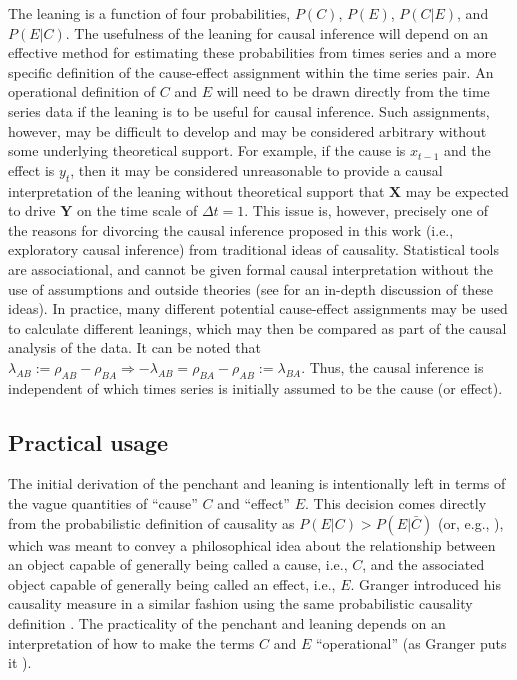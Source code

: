 The leaning is a function of four probabilities, $P(C)$, $P(E)$, $P(C|E)$, and $P(E|C)$.  The usefulness of the leaning for causal inference will depend on an effective method for estimating these probabilities from times series and a more specific definition of the cause-effect assignment within the time series pair.  An operational definition of $C$ and $E$ will need to be drawn directly from the time series data if the leaning is to be useful for causal inference.  Such assignments, however, may be difficult to develop and may be considered arbitrary without some underlying theoretical support.  For example, if the cause is $x_{t-1}$ and the effect is $y_{t}$, then it may be considered unreasonable to provide a causal interpretation of the leaning without theoretical support that $\mathbf{X}$ may be expected to drive $\mathbf{Y}$ on the time scale of $\Delta t=1$.  This issue is, however, precisely one of the reasons for divorcing the causal inference proposed in this work (i.e., exploratory causal inference) from traditional ideas of causality.  Statistical tools are associational, and cannot be given formal causal interpretation without the use of assumptions and outside theories (see \cite{Illari2014} for an in-depth discussion of these ideas).  In practice, many different potential cause-effect assignments may be used to calculate different leanings, which may then be compared as part of the causal analysis of the data.  It can be noted that $\lambda_{AB} := \rho_{AB} - \rho_{BA}\Rightarrow -\lambda_{AB} = \rho_{BA} - \rho_{AB} := \lambda_{BA}$.  Thus, the causal inference is independent of which times series is initially assumed to be the cause (or effect).

\subsection{Practical usage}
The initial derivation of the penchant and leaning is intentionally left in terms of the vague quantities of ``cause'' $C$ and ``effect'' $E$.  This decision comes directly from the probabilistic definition of causality as $P(E|C)>P(E|\bar{C})$ \cite{Suppes1970} (or, e.g., \cite{Illari2014}), which was meant to convey a philosophical idea about the relationship between an object capable of generally being called a cause, i.e., $C$, and the associated object capable of generally being called an effect, i.e., $E$.   Granger introduced his causality measure in a similar fashion using the same probabilistic causality definition \cite{Granger1980}.  The practicality of the penchant and leaning depends on an interpretation of how to make the terms $C$ and $E$ ``operational'' (as Granger puts it \cite{Granger1980}).  

